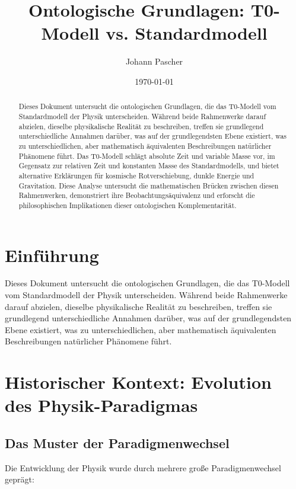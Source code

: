 \documentclass[12pt,a4paper]{article}
\title{Ontologische Grundlagen: T0-Modell vs. Standardmodell}
\author{Johann Pascher}
\date{\today}
\begin{document}
	
	\maketitle
	
	\begin{abstract}
		Dieses Dokument untersucht die ontologischen Grundlagen, die das T0-Modell vom Standardmodell der Physik unterscheiden. Während beide Rahmenwerke darauf abzielen, dieselbe physikalische Realität zu beschreiben, treffen sie grundlegend unterschiedliche Annahmen darüber, was auf der grundlegendsten Ebene existiert, was zu unterschiedlichen, aber mathematisch äquivalenten Beschreibungen natürlicher Phänomene führt. Das T0-Modell schlägt absolute Zeit und variable Masse vor, im Gegensatz zur relativen Zeit und konstanten Masse des Standardmodells, und bietet alternative Erklärungen für kosmische Rotverschiebung, dunkle Energie und Gravitation. Diese Analyse untersucht die mathematischen Brücken zwischen diesen Rahmenwerken, demonstriert ihre Beobachtungsäquivalenz und erforscht die philosophischen Implikationen dieser ontologischen Komplementarität.
	\end{abstract}
	
	\tableofcontents
	\newpage
	
	\section{Einführung}
	
	Dieses Dokument untersucht die ontologischen Grundlagen, die das T0-Modell vom Standardmodell der Physik unterscheiden. Während beide Rahmenwerke darauf abzielen, dieselbe physikalische Realität zu beschreiben, treffen sie grundlegend unterschiedliche Annahmen darüber, was auf der grundlegendsten Ebene existiert, was zu unterschiedlichen, aber mathematisch äquivalenten Beschreibungen natürlicher Phänomene führt.
	
	\section{Historischer Kontext: Evolution des Physik-Paradigmas}
	
	\subsection{Das Muster der Paradigmenwechsel}
	
	Die Entwicklung der Physik wurde durch mehrere große Paradigmenwechsel geprägt:
	
\end{document}
